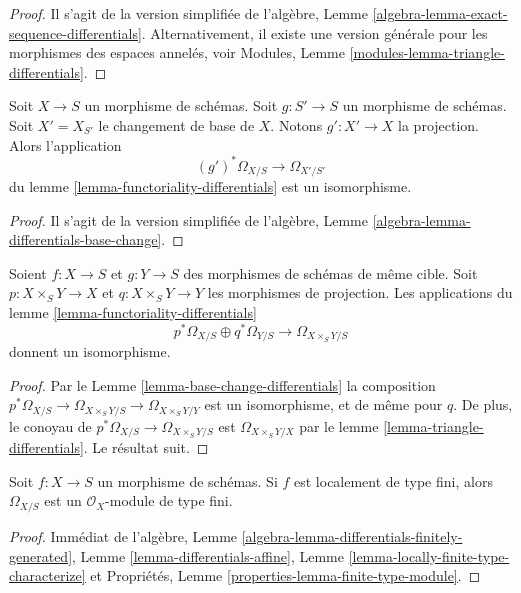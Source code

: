 \begin{proof}
Il s'agit de la version simplifiée
de l'algèbre, Lemme \ref{algebra-lemma-exact-sequence-differentials}. Alternativement,
il existe une version générale pour les morphismes
des espaces annelés, voir Modules, Lemme \ref{modules-lemma-triangle-differentials}.
\end{proof}

\begin{lemma}
\label{lemma-base-change-differentials}
Soit $X \to S$ un morphisme de schémas. Soit
$g : S' \to S$ un morphisme de schémas. Soit $X' = X_{S'}$
le changement de base de $X$.
Notons $g' : X' \to X$ la projection. Alors
l'application
$$
(g')^*\Omega_{X/S} \to \Omega_{X'/S'}
$$
du lemme \ref{lemma-functoriality-differentials} est un isomorphisme.
\end{lemma}

\begin{proof}
Il s'agit de la version
simplifiée de l'algèbre, Lemme \ref{algebra-lemma-differentials-base-change}.
\end{proof}

\begin{lemma}
\label{lemma-differential-product}
Soient $f : X \to S$ et $g : Y \to S$ des morphismes de schémas
de même cible. Soit $p : X \times_S Y \to X$ et $q : X \times_S Y \to Y$ les morphismes
de projection. Les
applications du lemme \ref{lemma-functoriality-differentials}
$$
p^*\Omega_{X/S} \oplus q^*\Omega_{Y/S}
\longrightarrow
\Omega_{X \times_S Y/S}
$$
donnent un isomorphisme.
\end{lemma}

\begin{proof}
Par le Lemme \ref{lemma-base-change-differentials} la composition
$p^*\Omega_{X/S} \to \Omega_{X \times_S Y/S} \to \Omega_{X \times_S Y/Y}$ est un isomorphisme, et de même
pour $q$. De plus, le conoyau
de $p^*\Omega_{X/S} \to \Omega_{X \times_S Y/S}$ est $\Omega_{X \times_S Y/X}$
par le lemme
\ref{lemma-triangle-differentials}. Le résultat suit.
\end{proof}

\begin{lemma}
\label{lemma-finite-type-differentials}
Soit $f : X \to S$ un morphisme de schémas. Si $f$
est localement de type fini, alors $\Omega_{X/S}$ est
un $\mathcal{O}_X$-module de type fini.
\end{lemma}

\begin{proof}
Immédiat
de l'algèbre, Lemme \ref{algebra-lemma-differentials-finitely-generated},
Lemme \ref{lemma-differentials-affine},
Lemme \ref{lemma-locally-finite-type-characterize} et Propriétés,
Lemme \ref{properties-lemma-finite-type-module}.
\end{proof}

